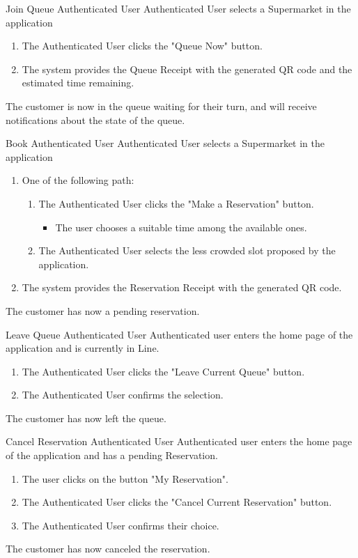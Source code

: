 \usecase
{Join Queue}
{Authenticated User}
{Authenticated User selects a Supermarket in the application}
{
        \begin{enumerate}
            \item The Authenticated User clicks the "Queue Now" button.
            \item The system provides the Queue Receipt with the generated QR code and the estimated time remaining.
        \end{enumerate}
}
{
    The customer is now in the queue waiting for their turn, and will receive notifications about the state of the queue.
}
{}
{}


\usecase
{Book}
{Authenticated User}
{Authenticated User selects a Supermarket in the application}
{
        \begin{enumerate}
            \item One of the following path:  
            \begin{enumerate}
                \item The Authenticated User clicks the "Make a Reservation" button.
                \begin{itemize}
                    \item The user chooses a suitable time among the available ones.
                \end{itemize}
                \item The Authenticated User selects the less crowded slot proposed by the application.
            \end{enumerate}
            \item The system provides the Reservation Receipt with the generated QR code.
        \end{enumerate}
}
{
    The customer has now a pending reservation.
}
{}
{}


\usecase
{Leave Queue}
{Authenticated User}
{Authenticated user enters the home page of the application and is currently in Line.}
{
    \begin{enumerate}
        \item The Authenticated User clicks the "Leave Current Queue" button.
        \item The Authenticated User confirms the selection.
    \end{enumerate}
}
{
    The customer has now left the queue.
}
{}
{}

\usecase
{Cancel Reservation}
{Authenticated User}
{Authenticated user enters the home page of the application and has a pending Reservation.}
{
    \begin{enumerate}
        \item The user clicks on the button "My Reservation".
        \item The Authenticated User clicks the "Cancel Current Reservation" button.
        \item The Authenticated User confirms their choice.
    \end{enumerate}
}
{
    The customer has now canceled the reservation.
}
{}
{}


